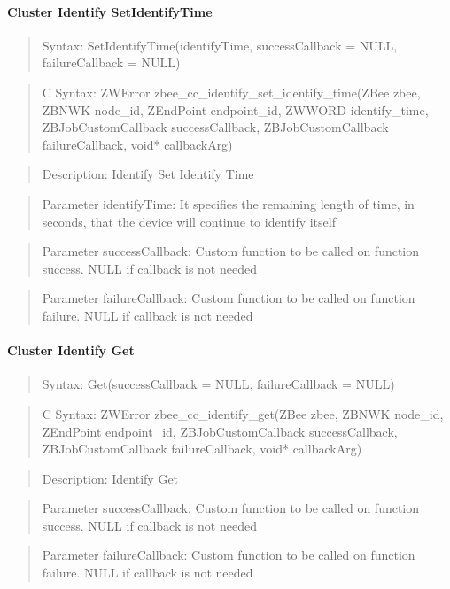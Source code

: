 \paragraph{Cluster Identify SetIdentifyTime}
\begin{quote}Syntax: SetIdentifyTime(identifyTime, successCallback = NULL, failureCallback = NULL)\end{quote}
\begin{quote}C Syntax: ZWError zbee\_cc\_identify\_set\_identify\_time(ZBee zbee, ZBNWK node\_id, ZEndPoint endpoint\_id, ZWWORD identify\_time, ZBJobCustomCallback successCallback, ZBJobCustomCallback failureCallback, void* callbackArg)\end{quote}
\begin{quote}Description: Identify Set Identify Time\end{quote}
\begin{quote}Parameter identifyTime: It specifies the remaining length of time, in seconds, that the device will continue to identify itself\end{quote}
\begin{quote}Parameter successCallback: Custom function to be called on function success. NULL if callback is not needed\end{quote}
\begin{quote}Parameter failureCallback: Custom function to be called on function failure. NULL if callback is not needed\end{quote}


\paragraph{Cluster Identify Get}
\begin{quote}Syntax: Get(successCallback = NULL, failureCallback = NULL)\end{quote}
\begin{quote}C Syntax: ZWError zbee\_cc\_identify\_get(ZBee zbee, ZBNWK node\_id, ZEndPoint endpoint\_id, ZBJobCustomCallback successCallback, ZBJobCustomCallback failureCallback, void* callbackArg)\end{quote}
\begin{quote}Description: Identify Get\end{quote}
\begin{quote}Parameter successCallback: Custom function to be called on function success. NULL if callback is not needed\end{quote}
\begin{quote}Parameter failureCallback: Custom function to be called on function failure. NULL if callback is not needed\end{quote}



